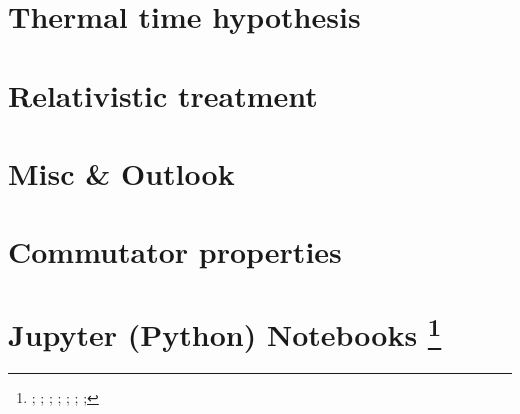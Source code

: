\iftodo
\chapter{Thermal time hypothesis}

\fi

\iftodo
\chapter{Relativistic treatment}

\fi

\iftodo
\chapter{Misc \& Outlook}

\fi

\appendix

\chapter{Commutator properties}


\chapter[Jupyter (Python) Notebooks]{Jupyter (Python) Notebooks \footnote{
  \cite{comp:python+sci};
  \cite{comp:scipy};
  \cite{comp:sympy};
  \cite{comp:jupyter};
  \cite{comp:matplotlib};
  \cite{comp:numpy};
  \cite{comp:python+sci+eng};
}}


\printbibliography[heading=bibintoc]



